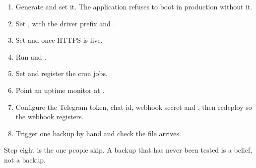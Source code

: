 \begin{enumerate}
  \item Generate  and set it. The application refuses to boot
        in production without it.
  \item Set , with the driver prefix and .
  \item Set  and  once HTTPS is
        live.
  \item Run  and .
  \item Set  and register the cron jobs.
  \item Point an uptime monitor at .
  \item Configure the Telegram token, chat id, webhook secret and
        , then redeploy so the webhook registers.
  \item Trigger one backup by hand and check the file arrives.
\end{enumerate}

Step eight is the one people skip. A backup that has never been tested is a
belief, not a backup.
